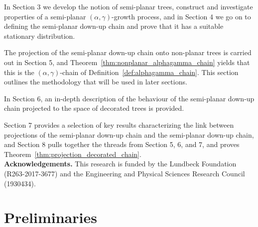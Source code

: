 \documentclass[a4paper, final]{amsart}
\theoremstyle{plain}
\theoremstyle{definition}
\begin{document}
In Section 3 we develop the notion of semi-planar trees, construct and investigate properties of a semi-planar $(\alpha, \gamma)$-growth process, and in Section 4 we go on to defining the semi-planar down-up chain and prove that it has a suitable stationary distribution.

The projection of the semi-planar down-up chain onto non-planar trees is carried out in Section 5, and Theorem~\ref{thm:nonplanar_alphagamma_chain} yields that this is the $(\alpha, \gamma)$-chain of Definition~\ref{def:alphagamma_chain}.
This section outlines the methodology that will be used in later sections.

In Section 6, an in-depth description of the behaviour of the semi-planar down-up chain projected to the space of decorated trees is provided.

Section 7 provides a selection of key results characterizing the link between projections of the semi-planar down-up chain and the semi-planar down-up chain, and Section 8 pulls together the threads from Section 5, 6, and 7, and proves Theorem~\ref{thm:projection_decorated_chain}. \\

\textbf{Acknowledgements.}
This research is funded by the Lundbeck Foundation (R263-2017-3677) and the Engineering and Physical Sciences Research Council (1930434).
%

\section{Preliminaries}\label{sec:prelims}
%
\end{document}
